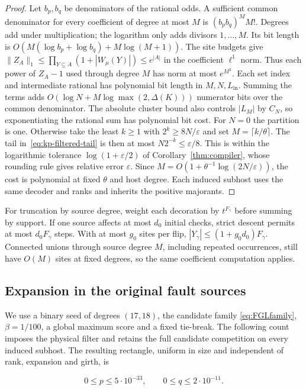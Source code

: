 \documentclass[10pt,twocolumn]{article}
\theoremstyle{definition}
\newcommand{\Lin}{L_{\mathrm{in}}}
\begin{document}
\begin{proof}
Let $b_p,b_q$ be denominators of the rational odds. A sufficient common
denominator for every coefficient of degree at most $M$ is
$(b_pb_q)^M M!$. Degrees add under multiplication; the logarithm only
adds divisors $1,\ldots,M$. Its bit length is
$O(M(\log b_p+\log b_q)+M\log(M+1))$. The site budgets give
$\|Z_A\|_1\le\prod_{Y\subseteq A}(1+|W_\mu(Y)|)\le e^{|A|}$
in the coefficient $\ell^1$ norm. Thus each power of $Z_A-1$ used
through degree $M$ has norm at most $e^{M^2}$. Each set index and
intermediate rational has polynomial bit length in $M,N,\Lin$.
Summing the terms adds $O(\log N+M\log\max(2,\Delta(K)))$ numerator bits
over the common denominator.
The absolute cluster bound also controls $|L_M|$ by $C_N$, so
exponentiating the rational sum has polynomial bit cost.
For $N=0$ the partition is one. Otherwise take the least $k\ge1$
with $2^k\ge8N/\varepsilon$ and set $M=\lceil k/\theta\rceil$.
The tail in~\eqref{eq:kp-filtered-tail} is then at most
$N2^{-k}\le\varepsilon/8$. This is within the logarithmic tolerance
$\log(1+\varepsilon/2)$ of Corollary~\ref{thm:compiler}, whose
rounding rule gives relative error $\varepsilon$. Since
$M=O(1+\theta^{-1}\log(2N/\varepsilon))$, the cost is polynomial
at fixed $\theta$ and host degree. Each induced subhost uses the
same decoder and ranks and inherits the positive majorants.
\end{proof}

For truncation by source degree, weight each decoration by $t^{F_\gamma}$
before summing by support. If one source affects at most $d_0$ initial
checks, strict descent permits at most $d_0F_\gamma$ steps. With at
most $g_0$ sites per flip, $|Y_\gamma|\le(1+g_0d_0)F_\gamma$. Connected
unions through source degree $M$, including repeated occurrences, still
have $O(M)$ sites at fixed degrees, so the same coefficient computation
applies.

\subsection{Expansion in the original fault sources}\label{app:mixed-pq}\label{app:mixed-source-cumulants}
We use a binary seed of degrees $(17,18)$, the candidate family
\eqref{eq:FGLfamily}, $\beta=1/100$, a global maximum score and a
fixed tie-break. The following count imposes the physical filter and
retains the full candidate competition on every induced subhost.
The resulting rectangle, uniform in size and independent of rank,
expansion and girth, is

\begin{equation}\label{eq:mixed-source-region}
 0\le p\le5\cdot10^{-33},\qquad 0\le q\le2\cdot10^{-11}.
\end{equation}
\end{document}
